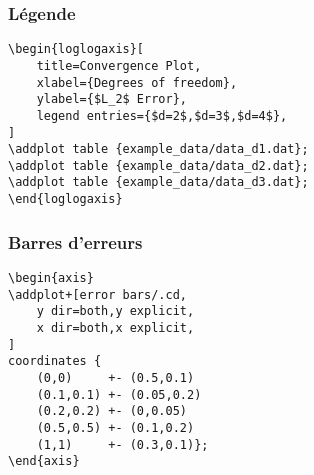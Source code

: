 \documentclass{clic_latex_beamer}
\begin{document}
\begin{frame}[fragile]
\frametitle{Légende}
\begin{multicols}{2}

\columnbreak

\begin{lstlisting}
\begin{loglogaxis}[
    title=Convergence Plot,
    xlabel={Degrees of freedom},
    ylabel={$L_2$ Error},
    legend entries={$d=2$,$d=3$,$d=4$},
]
\addplot table {example_data/data_d1.dat};
\addplot table {example_data/data_d2.dat};
\addplot table {example_data/data_d3.dat};
\end{loglogaxis}
\end{lstlisting}

\end{multicols}

\end{frame}

\begin{frame}[fragile]
\frametitle{Barres d'erreurs}
\begin{multicols}{2}

\columnbreak

\begin{lstlisting}
\begin{axis}
\addplot+[error bars/.cd,
    y dir=both,y explicit,
    x dir=both,x explicit,
]
coordinates {
    (0,0)     +- (0.5,0.1)
    (0.1,0.1) +- (0.05,0.2)
    (0.2,0.2) +- (0,0.05)
    (0.5,0.5) +- (0.1,0.2)
    (1,1)     +- (0.3,0.1)};
\end{axis}
\end{lstlisting}

\end{multicols}

\end{frame}
\end{document}
